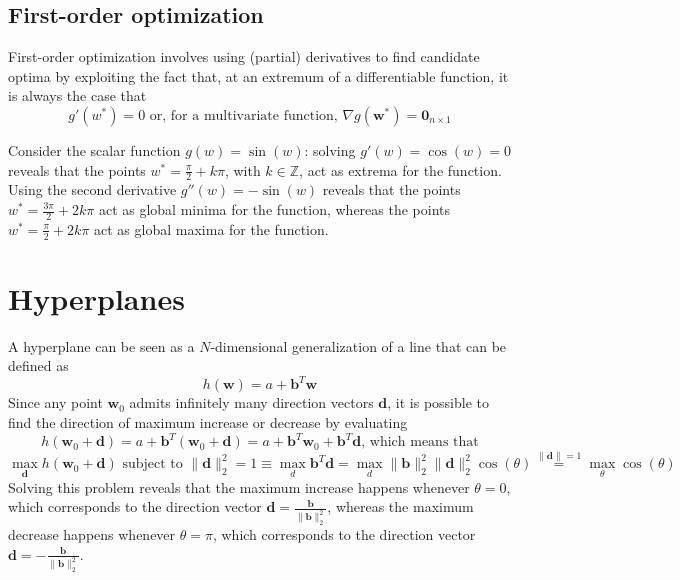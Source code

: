 \documentclass{report}
\begin{document}
\subsection{First-order optimization}
First-order optimization involves using (partial) derivatives to find candidate optima by exploiting the fact that, at an extremum of a differentiable function, it is always the case that
\[g'(w^*) = 0 \text{ or, for a multivariate function, } \nabla g(\mathbf{w}^*) = \mathbf{0}_{n \times 1}\]
\begin{examplebox}
    Consider the scalar function $\displaystyle g(w) = \sin(w)$: solving $\displaystyle g'(w) = \cos(w) = 0$ reveals that the points $\displaystyle w^* = \frac{\pi}{2} + k\pi$, with $\displaystyle k \in \mathbb{Z}$, act as extrema for the function. \newline
    Using the second derivative $\displaystyle g''(w) = -\sin(w)$ reveals that the points $\displaystyle w^* = \frac{3\pi}{2} + 2k\pi$ act as global minima for the function, whereas the points $\displaystyle w^* = \frac{\pi}{2} + 2k\pi$ act as global maxima for the function.
\end{examplebox}
\section{Hyperplanes}
A hyperplane can be seen as a $\displaystyle N$-dimensional generalization of a line that can be defined as
\[h(\mathbf{w}) = a + \mathbf{b}^T\mathbf{w}\]
Since any point $\displaystyle \mathbf{w}_0$ admits infinitely many direction vectors $\displaystyle \mathbf{d}$, it is possible to find the direction of maximum increase or decrease by evaluating
\[h(\mathbf{w}_0 + \mathbf{d}) = a + \mathbf{b}^T(\mathbf{w}_0 + \mathbf{d}) = a + \mathbf{b}^T\mathbf{w}_0 + \mathbf{b}^T\mathbf{d} \text{, which means that}\]
\[\max_{\mathbf{d}} h(\mathbf{w}_0 + \mathbf{d}) \text{ subject to } \lVert \mathbf{d} \rVert_2^2 = 1 \equiv \max_d \mathbf{b}^T\mathbf{d} = \max_d \lVert \mathbf{b} \rVert_2^2\lVert \mathbf{d} \rVert_2^2 \cos(\theta) \stackrel{\lVert \mathbf{d} \rVert = 1}{=} \max_{\theta} \cos(\theta)\]
Solving this problem reveals that the maximum increase happens whenever $\displaystyle \theta = 0$, which corresponds to the direction vector $\displaystyle \mathbf{d} = \frac{\mathbf{b}}{\lVert \mathbf{b} \rVert_2^2}$, whereas the maximum decrease happens whenever $\displaystyle \theta = \pi$, which corresponds to the direction vector $\displaystyle \mathbf{d} = -\frac{\mathbf{b}}{\lVert \mathbf{b} \rVert_2^2}$.
\end{document}
